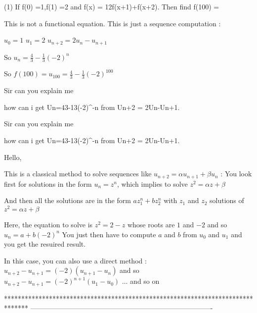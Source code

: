 \begin{solution}
	\begin{tcolorbox}\begin{bolded}(1) If f(0) =1,f(1) =2 and f(x) = 1\/2{f(x+1)+f(x+2)}. Then find f(100) = \end{bolded}\end{tcolorbox}

This is not a functional equation. This is just a sequence computation :

$ u_0=1$
$ u_1=2$
$ u_{n+2}=2u_n-u_{n+1}$

So $ u_n=\frac 43 -\frac 13(-2)^n$

So $ f(100)=u_{100}=\frac 43 -\frac 13(-2)^{100}$
\end{solution}



\begin{solution}
	\begin{bolded}Sir can you explain me 
 
how can i get Un=4\/3-1\/3(-2)^-n from  Un+2 = 2Un-Un+1.\end{bolded}
\end{solution}



\begin{solution}
	\begin{tcolorbox}\begin{bolded}Sir can you explain me 
 
how can i get Un=4\/3-1\/3(-2)^-n from  Un+2 = 2Un-Un+1.\end{bolded}\end{tcolorbox}

Hello,

This is a classical method to solve sequences like $ u_{n+2}=\alpha u_{n+1} + \beta u_{n}$ :
You look first for solutions in the form $ u_n=z^n$, which implies to solve $ z^2=\alpha z + \beta$

And then all the solutions are in the form $ az_1^n + b z_2^n$ with $ z_1$ and $ z_2$ solutions of $ z^2=\alpha z + \beta$

Here, the equation to solve is $ z^2=2-z$ whose roots are $ 1$ and $ -2$ and so $ u_n=a + b(-2)^n$
You just then have to compute $ a$ and $ b$ from $ u_0$ and $ u_1$ and you get the resuired result.

In this case, you can also use a direct method : $ u_{n+2}-u_{n+1}=(-2)(u_{n+1}-u_n)$ and so $ u_{n+2}-u_{n+1}=(-2)^{n+1}(u_1-u_0)$ ... and so on
\end{solution}
*******************************************************************************
-------------------------------------------------------------------------------

